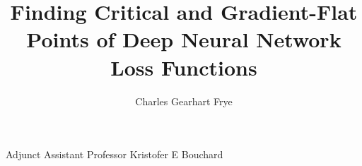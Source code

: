 
\title{Finding Critical and Gradient-Flat Points of Deep Neural Network Loss Functions}
\author{Charles Gearhart Frye}
{Adjunct Assistant Professor Kristofer E Bouchard}

\maketitle
\copyrightpage{}



